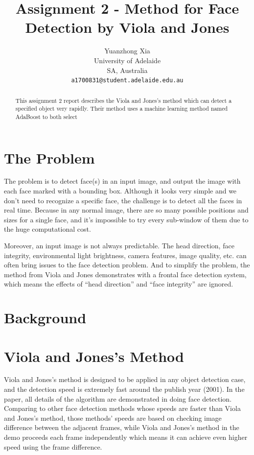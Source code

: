 \documentclass[10pt,twocolumn,letterpaper]{article}
\begin{document}
\title{Assignment 2 - Method for Face Detection by Viola and Jones}
\author{Yuanzhong Xia\\
University of Adelaide\\
SA, Australia\\
{\tt\small a1700831@student.adelaide.edu.au}
}
\maketitle

\begin{abstract}
This assignment 2 report describes the Viola and Jones's method{\cite{origin}} which can detect a specified object very rapidly.
Their method uses a machine learning method named AdaBoost \cite{adaboost} to both select

\end{abstract}


\section{The Problem}
The problem is to detect face(s) in an input image, and output the image with each face marked with a bounding box.
Although it looks very simple and we don't need to recognize a specific face, the challenge is to detect all the faces in real time.
Because in any normal image, there are so many possible positions and sizes for a single face,
and it's impossible to try every sub-window of them due to the huge computational cost.

Moreover, an input image is not always predictable. The head direction, face integrity, environmental light brightness,
camera features, image quality, etc. can often bring issues to the face detection problem.
And to simplify the problem, the method from Viola and Jones demonstrates with a frontal face detection system,
which means the effects of ``head direction'' and ``face integrity'' are ignored.

\section{Background} \label{sec:bg}


\section{Viola and Jones's Method}
Viola and Jones's method is designed to be applied in any object detection case, and the detection speed is extremely fast around the publish year (2001).
In the paper, all details of the algorithm are demonstrated in doing face detection.
Comparing to other face detection methods whose speeds are faster than Viola and Jones's method,
those methods' speeds are based on checking image difference between the adjacent frames,
while Viola and Jones's method in the demo proceeds each frame independently which means it can achieve even higher speed using the frame difference.
\end{document}

